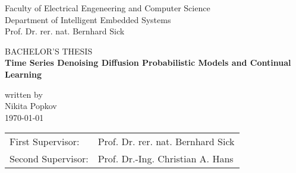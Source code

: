 %
%

\begin{titlepage}
    \begin{center}
    

    \vspace*{0.5cm}

    \large{Faculty of Electrical Engeneering and Computer Science}\\
    \vspace*{0.5cm} \large{Department of Intelligent Embedded Systems\\ Prof.
    Dr. rer. nat. Bernhard Sick}

    \vspace*{2cm}
    \large {BACHELOR'S THESIS}\\
    \vspace*{1cm} \Huge {\textbf{Time Series Denoising Diffusion Probabilistic Models and Continual Learning} }\\
    \vspace*{1cm}

    \normalsize{written by} \\
    \large{Nikita Popkov} \\
    \vspace*{1.5cm} \normalsize{\today}

    \vspace*{1cm}

        \begin{center}
            \begin{tabular}{ll}
             First Supervisor: & Prof. Dr. rer. nat. Bernhard Sick\\
             Second Supervisor: & Prof. Dr.-Ing. Christian A. Hans \\
            \end{tabular}
        \end{center}

    \end{center}
\end{titlepage}